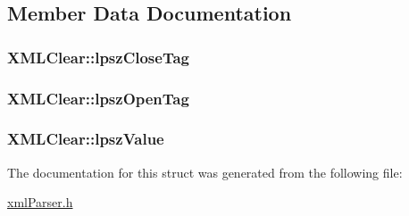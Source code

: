\subsection{Member Data Documentation}
\hypertarget{structXMLClear_a28c30d46f2965cfdea9dcd7ff10e0386}{
\subsubsection[{lpsz\-Close\-Tag}]{ X\-M\-L\-Clear\-::lpsz\-Close\-Tag}}\label{structXMLClear_a28c30d46f2965cfdea9dcd7ff10e0386}
\hypertarget{structXMLClear_a2df4ad4786cc0d3f7eae94607a02f6e3}{
\subsubsection[{lpsz\-Open\-Tag}]{ X\-M\-L\-Clear\-::lpsz\-Open\-Tag}}\label{structXMLClear_a2df4ad4786cc0d3f7eae94607a02f6e3}
\hypertarget{structXMLClear_a72d26ba6f77bdfc5fdaf0e0802d8809e}{
\subsubsection[{lpsz\-Value}]{ X\-M\-L\-Clear\-::lpsz\-Value}}\label{structXMLClear_a72d26ba6f77bdfc5fdaf0e0802d8809e}


The documentation for this struct was generated from the following file\-:\begin{DoxyCompactItemize}
\item 
\hyperlink{xmlParser_8h}{xml\-Parser.\-h}\end{DoxyCompactItemize}
